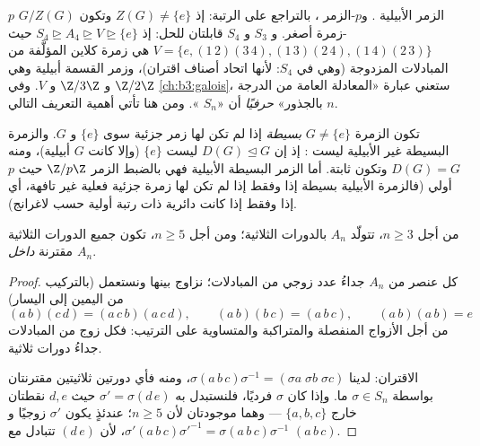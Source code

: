 \begin{example}\label{ex:b3:groups:solvableexamples}
الزمر الأبيلية . و$p$-الزمر ، بالتراجع على
الرتبة: إذ $Z(G) \neq \{e\}$ وتكون $G/Z(G)$ $p$-زمرة أصغر. و $S_3$ و $S_4$
قابلتان للحل: إذ $S_4 \trianglerighteq A_4
\trianglerighteq V \trianglerighteq \{e\}$ حيث $V = \{e,
(1\,2)(3\,4), (1\,3)(2\,4), (1\,4)(2\,3)\}$ هي زمرة كلاين المؤلَّفة من
المبادلات المزدوجة (وهي  في $S_4$: لأنها اتحاد أصناف
اقتران)، وزمر القسمة أبيلية وهي $\Z/2\Z$ و $\Z/3\Z$ و $V$. وفي
\cref{ch:b3:galois}، ستعني عبارة «المعادلة العامة من الدرجة $n$ 
بالجذور» \emph{حرفيًا} أن «$S_n$ ». ومن هنا تأتي
أهمية التعريف التالي.
\end{example}

\begin{definition}\label{def:b3:groups:simple}
تكون الزمرة $G \neq \{e\}$ \emph{بسيطة} إذا لم
تكن لها زمر جزئية  سوى $\{e\}$ و $G$. والزمرة البسيطة غير
الأبيلية ليست : إذ إن $D(G) \trianglelefteq G$ ليست $\{e\}$ (وإلا كانت
$G$ أبيلية)، ومنه $D(G) = G$ وتكون  ثابتة. أما
الزمر البسيطة الأبيلية فهي بالضبط الزمر $\Z/p\Z$ حيث $p$ أولي
(فالزمرة الأبيلية بسيطة إذا وفقط إذا لم تكن لها زمرة جزئية فعلية
غير تافهة، أي إذا وفقط إذا كانت دائرية ذات رتبة أولية حسب
لاغرانج).
\end{definition}

\begin{lemma}\label{lem:b3:groups:threecycles}
من أجل $n \geq 3$، تتولّد $A_n$ بالدورات الثلاثية؛ ومن أجل
$n \geq 5$، تكون جميع الدورات الثلاثية مقترنة \emph{داخل $A_n$}.
\end{lemma}

\begin{proof}
كل عنصر من $A_n$ جداءُ عدد زوجي من المبادلات؛ نزاوج بينها ونستعمل
(بالتركيب من اليمين إلى اليسار)
\[
(a\,b)(c\,d) = (a\,c\,b)(a\,c\,d), \qquad
(a\,b)(b\,c) = (a\,b\,c), \qquad
(a\,b)(a\,b) = e
\]
من أجل الأزواج المنفصلة والمتراكبة والمتساوية على الترتيب: فكل
زوج من المبادلات جداءُ دورات ثلاثية.

الاقتران: لدينا $\sigma(a\,b\,c)\sigma^{-1} = (\sigma a\; \sigma b\;
\sigma c)$، ومنه فأي دورتين ثلاثيتين مقترنتان
بواسطة $\sigma \in
S_n$ ما. وإذا كان $\sigma$ فرديًا، فلنستبدل به $\sigma' = \sigma (d\,e)$
حيث $d, e$ نقطتان خارج $\{a, b, c\}$ --- وهما موجودتان لأن
$n \geq 5$؛ عندئذٍ يكون $\sigma'$ زوجيًا و $\sigma'(a\,b\,c)
\sigma'^{-1} = \sigma(a\,b\,c)\sigma^{-1}$، لأن $(d\,e)$
تتبادل مع $(a\,b\,c)$.
\end{proof}

